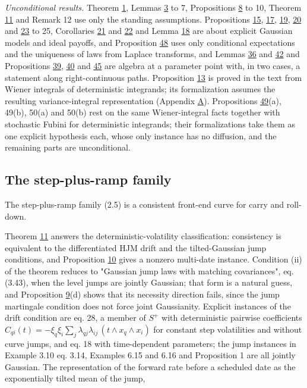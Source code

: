 \documentclass[11pt]{article}
\begin{document}
\emph{Unconditional results.} Theorem \hyperref[res:Theorem-1]{1}, Lemmas \hyperref[res:Lemma-3]{3} to 7, Propositions \hyperref[res:Proposition-8]{8} to 10, Theorem \hyperref[res:Theorem-11]{11} and Remark 12 use only the standing assumptions. Propositions \hyperref[res:Proposition-15]{15}, \hyperref[res:Proposition-17]{17}, \hyperref[res:Proposition-19]{19}, \hyperref[res:Proposition-20]{20} and \hyperref[res:Proposition-23]{23} to 25, Corollaries \hyperref[res:Corollary-21]{21} and \hyperref[res:Corollary-22]{22} and Lemma \hyperref[res:Lemma-18]{18} are about explicit Gaussian models and ideal payoffs, and Proposition \hyperref[res:Proposition-48]{48} uses only conditional expectations and the uniqueness of laws from Laplace transforms, and Lemmas \hyperref[res:Lemma-36]{36} and \hyperref[res:Lemma-42]{42} and Propositions \hyperref[res:Proposition-39]{39}, \hyperref[res:Proposition-40]{40} and \hyperref[res:Proposition-45]{45} are algebra at a parameter point with, in two cases, a statement along right-continuous paths. Proposition \hyperref[res:Proposition-13]{13} is proved in the text from Wiener integrals of deterministic integrands; its formalization assumes the resulting variance-integral representation (Appendix \hyperref[sec:A]{A}). Propositions \hyperref[res:Proposition-49]{49}(a), 49(b), 50(a) and 50(b) rest on the same Wiener-integral facts together with stochastic Fubini for deterministic integrands; their formalizations take them as one explicit hypothesis each, whose only instance has no diffusion, and the remaining parts are unconditional.

\subsection{The step-plus-ramp family}\label{sec:5.2}

The step-plus-ramp family (2.5) is a consistent front-end curve for carry and roll-down.

Theorem \hyperref[res:Theorem-11]{11} answers the deterministic-volatility classification: consistency is equivalent to the differentiated HJM drift and the tilted-Gaussian jump conditions, and Proposition \hyperref[res:Proposition-10]{10} gives a nonzero multi-date instance. Condition (ii) of the theorem reduces to "Gaussian jump laws with matching covariances", eq. (3.43), when the level jumps are jointly Gaussian; that form is a natural guess, and Proposition \hyperref[res:Proposition-9]{9}(d) shows that its necessity direction fails, since the jump martingale condition does not force joint Gaussianity. Explicit instances of the drift condition are \cite{gellert2021short} eq. 28, a member of \(S^+\) with deterministic pairwise coefficients \(C_{qi}(t) = -\xi_q \xi_i \sum_j \lambda_{qj} \lambda_{ij}\,(t \wedge x_q \wedge x_i)\) for constant step volatilities and without curve jumps, and \cite{brace2024sofr} eq. 18 with time-dependent parameters; the jump instances in \cite{fontana2022term} Example 3.10 eq. 3.14, \cite{kellerressel2018affine} Examples 6.15 and 6.16 and \cite{kim2014jumps} Proposition 1 are all jointly Gaussian. The representation of the forward rate before a scheduled date as the exponentially tilted mean of the jump,
\end{document}
